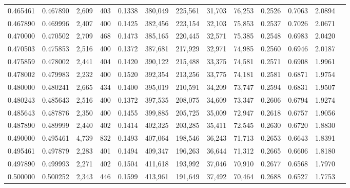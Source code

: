 \begin{tabular}{rrrrrrrrrrrrr}
0.465461 & 0.467890 &  2,609 &   403 &                                     0.1338 & 380,049 & 225,561 &  31,703 &  76,253 & 0.2526 & 0.7063 & 2.0894 \\
0.467890 & 0.469996 &  2,407 &   400 &                                     0.1425 & 382,456 & 223,154 &  32,103 &  75,853 & 0.2537 & 0.7026 & 2.0671 \\
0.470000 & 0.470502 &  2,709 &   468 &                                     0.1473 & 385,165 & 220,445 &  32,571 &  75,385 & 0.2548 & 0.6983 & 2.0420 \\
0.470503 & 0.475853 &  2,516 &   400 &                                     0.1372 & 387,681 & 217,929 &  32,971 &  74,985 & 0.2560 & 0.6946 & 2.0187 \\
0.475859 & 0.478002 &  2,441 &   404 &                                     0.1420 & 390,122 & 215,488 &  33,375 &  74,581 & 0.2571 & 0.6908 & 1.9961 \\
0.478002 & 0.479983 &  2,232 &   400 &                                     0.1520 & 392,354 & 213,256 &  33,775 &  74,181 & 0.2581 & 0.6871 & 1.9754 \\
0.480000 & 0.480241 &  2,665 &   434 &                                     0.1400 & 395,019 & 210,591 &  34,209 &  73,747 & 0.2594 & 0.6831 & 1.9507 \\
0.480243 & 0.485643 &  2,516 &   400 &                                     0.1372 & 397,535 & 208,075 &  34,609 &  73,347 & 0.2606 & 0.6794 & 1.9274 \\
0.485643 & 0.487876 &  2,350 &   400 &                                     0.1455 & 399,885 & 205,725 &  35,009 &  72,947 & 0.2618 & 0.6757 & 1.9056 \\
0.487890 & 0.489999 &  2,440 &   402 &                                     0.1414 & 402,325 & 203,285 &  35,411 &  72,545 & 0.2630 & 0.6720 & 1.8830 \\
0.490000 & 0.495461 &  4,739 &   832 &                                     0.1493 & 407,064 & 198,546 &  36,243 &  71,713 & 0.2653 & 0.6643 & 1.8391 \\
0.495461 & 0.497879 &  2,283 &   401 &                                     0.1494 & 409,347 & 196,263 &  36,644 &  71,312 & 0.2665 & 0.6606 & 1.8180 \\
0.497890 & 0.499993 &  2,271 &   402 &                                     0.1504 & 411,618 & 193,992 &  37,046 &  70,910 & 0.2677 & 0.6568 & 1.7970 \\
0.500000 & 0.500252 &  2,343 &   446 &                                     0.1599 & 413,961 & 191,649 &  37,492 &  70,464 & 0.2688 & 0.6527 & 1.7753 \\

\end{tabular}
